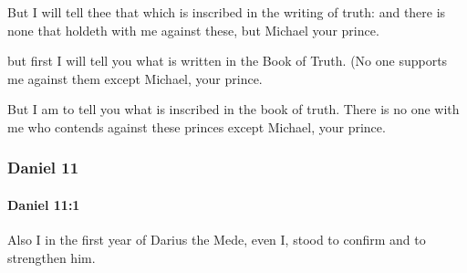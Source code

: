 			\begin{versebox}
					\item[BHS] 
					\item[LXX] 
					\item[ASV] But I will tell thee that which is inscribed in the writing of truth: and there is none that holdeth with me against these, but Michael your prince.
					\item[NIV] but first I will tell you what is written in the Book of Truth. (No one supports me against them except Michael, your prince.
					\item[NRSV] But I am to tell you what is inscribed in the book of truth. There is no one with me who contends against these princes except Michael, your prince.
			\end{versebox}
	\subsubsection{Daniel 11} %
		\label{DANIEL-11}

		\paragraph{Daniel 11:1} %
			\label{DANIEL-11-1}

			Also I in the first year of Darius the Mede, even I, stood to confirm and to strengthen him.

